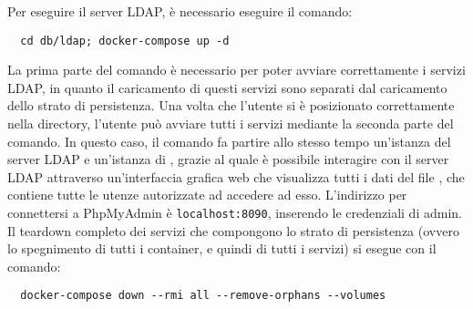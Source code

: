 \documentclass[../../manuale-manutentore.tex]{subfiles}
\begin{document}
Per eseguire il server LDAP, è necessario eseguire il comando:

\begin{verbatim}
  cd db/ldap; docker-compose up -d
\end{verbatim}

La prima parte del comando è necessario per poter avviare correttamente i servizi LDAP, in quanto il caricamento di questi servizi sono separati dal caricamento dello strato di persistenza.
Una volta che l'utente si è posizionato correttamente nella directory, l'utente può avviare tutti i servizi mediante la seconda parte del comando.
In questo caso, il comando fa partire allo stesso tempo un'istanza del server LDAP e un'istanza di , grazie al quale è possibile interagire con il server LDAP attraverso un'interfaccia grafica web che visualizza tutti i dati del file , che contiene tutte le utenze autorizzate ad accedere ad esso.
L'indirizzo per connettersi a PhpMyAdmin è \texttt{localhost:8090}, inserendo le credenziali di admin.
Il teardown completo dei servizi che compongono lo strato di persistenza (ovvero lo spegnimento di tutti i container, e quindi di tutti i servizi) si esegue con il comando:

\begin{verbatim}
  docker-compose down --rmi all --remove-orphans --volumes
\end{verbatim}
\end{document}
